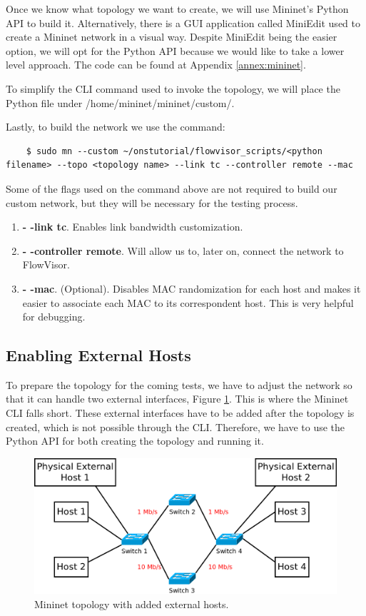Once we know what topology we want to create, we will use Mininet's Python API to build it. Alternatively, there is a GUI application called MiniEdit used to create a Mininet network in a visual way. Despite MiniEdit being the easier option, we will opt for the Python API because we would like to take a lower level approach. The code can be found at Appendix \ref{annex:mininet}.

To simplify the CLI command used to invoke the topology, we will place the Python file under /home/mininet/mininet/custom/.

Lastly, to build the network we use the command:
\begin{lstlisting}
    $ sudo mn --custom ~/onstutorial/flowvisor_scripts/<python filename> --topo <topology name> --link tc --controller remote --mac
\end{lstlisting}

Some of the flags used on the command above are not required to build our custom network, but they will be necessary for the testing process.
\begin{enumerate}
    \item \textbf{- -link tc}. Enables link bandwidth customization.
    \item \textbf{- -controller remote}. Will allow us to, later on, connect the network to FlowVisor.
    \item \textbf{- -mac}. (Optional). Disables MAC randomization for each host and makes it easier to associate each MAC to its correspondent host. This is very helpful for debugging.
\end{enumerate}

\subsection{Enabling External Hosts}
To prepare the topology for the coming tests, we have to adjust the network so that it can handle two external interfaces, Figure \ref{fig:mininet_topology_external}. This is where the Mininet CLI falls short. These external interfaces have to be added after the topology is created, which is not possible through the CLI. Therefore, we have to use the Python API for both creating the topology and running it.

\begin{figure}
  \centering
  \includegraphics[width=\linewidth]{imagenes/Environment/mininet_topology_external_hosts.png}
  \caption{Mininet topology with added external hosts.}
  \label{fig:mininet_topology_external}
\end{figure}

